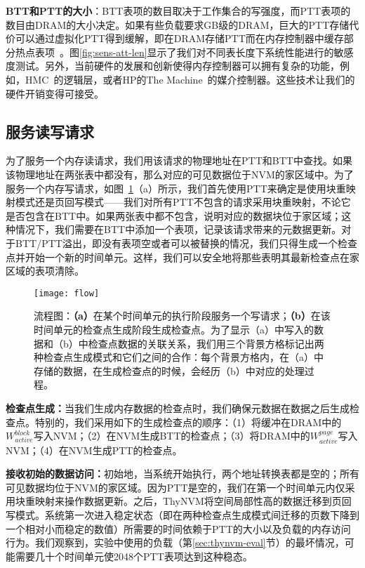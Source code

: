 \textbf{BTT和PTT的大小}：BTT表项的数目取决于工作集合的写强度，而PTT表项的数目由DRAM的大小决定。如果有些负载要求GB级的DRAM，巨大的PTT存储代价可以通过虚拟化PTT得到缓解，即在DRAM存储PTT而在内存控制器中缓存部分热点表项~\cite{Meza2012, Yoon2010, Burcea2008}。图\ref{fig:sens-att-len}显示了我们对不同表长度下系统性能进行的敏感度测试。另外，当前硬件的发展和创新使得内存控制器可以拥有复杂的功能，例如，HMC~\cite{HMC:2011}的逻辑层，或者HP的The Machine~\cite{TheMachine:2015}的媒介控制器。这些技术让我们的硬件开销变得可接受。

\subsection{服务读写请求}
\label{subsec:service-load-store}

为了服务一个内存读请求，我们用该请求的物理地址在PTT和BTT中查找。如果该物理地址在两张表中都没有，那么对应的可见数据位于NVM的家区域中。为了服务一个内存写请求，如图~\ref{fig:flow}（a）所示，我们首先使用PTT来确定是使用块重映射模式还是页回写模式——我们对所有PTT不包含的请求采用块重映射，不论它是否包含在BTT中。如果两张表中都不包含，说明对应的数据块位于家区域；这种情况下，我们需要在BTT中添加一个表项，记录该请求带来的元数据更新。对于BTT/PTT溢出，即没有表项空或者可以被替换的情况，我们只得生成一个检查点并开始一个新的时间单元。这样，我们可以安全地将那些表明其最新检查点在家区域的表项清除。

\begin{figure}[!h]
\centering
\texttt{[image: flow]}
\caption{流程图：\textbf{（a）}在某个时间单元的执行阶段服务一个写请求；\textbf{（b）}在该时间单元的检查点生成阶段生成检查点。为了显示（a）中写入的数据和（b）中检查点数据的关联关系，我们用三个背景方格标记出两种检查点生成模式和它们之间的合作：每个背景方格内，在（a）中存储的数据，在生成检查点的时候，会经历（b）中对应的处理过程。}
\label{fig:flow}
\end{figure}

\textbf{检查点生成：}当我们生成内存数据的检查点时，我们确保元数据在数据之后生成检查点。特别的，我们采用如下的生成检查点的顺序：（1）将缓冲在DRAM中的$W^{block}_{active}$写入NVM；（2）在NVM生成BTT的检查点；（3）将DRAM中的$W^{page}_{active}$写入NVM；（4）在NVM生成PTT的检查点。

\textbf{接收初始的数据访问：}初始地，当系统开始执行，两个地址转换表都是空的；所有可见数据均位于NVM的家区域。因为PTT是空的，我们在第一个时间单元内仅采用块重映射来操作数据更新。之后，ThyNVM将空间局部性高的数据迁移到页回写模式。系统第一次进入稳定状态（即在两种检查点生成模式间迁移的页数下降到一个相对小而稳定的数值）所需要的时间依赖于PTT的大小以及负载的内存访问行为。我们观察到，实验中使用的负载（第\ref{sec:thynvm-eval}节）的最坏情况，可能需要几十个时间单元使2048个PTT表项达到这种稳态。


